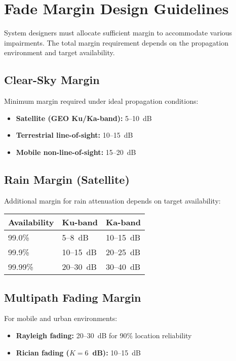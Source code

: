 \section{Fade Margin Design Guidelines}

System designers must allocate sufficient margin to accommodate various impairments. The total margin requirement depends on the propagation environment and target availability.

\subsection{Clear-Sky Margin}

Minimum margin required under ideal propagation conditions:

\begin{itemize}
\item \textbf{Satellite (GEO Ku/Ka-band):} 5--10~dB
\item \textbf{Terrestrial line-of-sight:} 10--15~dB
\item \textbf{Mobile non-line-of-sight:} 15--20~dB
\end{itemize}

\subsection{Rain Margin (Satellite)}

Additional margin for rain attenuation depends on target availability:

\begin{center}
\begin{tabular}{@{}lll@{}}
\toprule
\textbf{Availability} & \textbf{Ku-band} & \textbf{Ka-band} \\
\midrule
99.0\% & 5--8~dB & 10--15~dB \\
99.9\% & 10--15~dB & 20--25~dB \\
99.99\% & 20--30~dB & 30--40~dB \\
\bottomrule
\end{tabular}
\end{center}

\subsection{Multipath Fading Margin}

For mobile and urban environments:

\begin{itemize}
\item \textbf{Rayleigh fading:} 20--30~dB for 90\% location reliability
\item \textbf{Rician fading ($K = 6$~dB):} 10--15~dB
\end{itemize}

